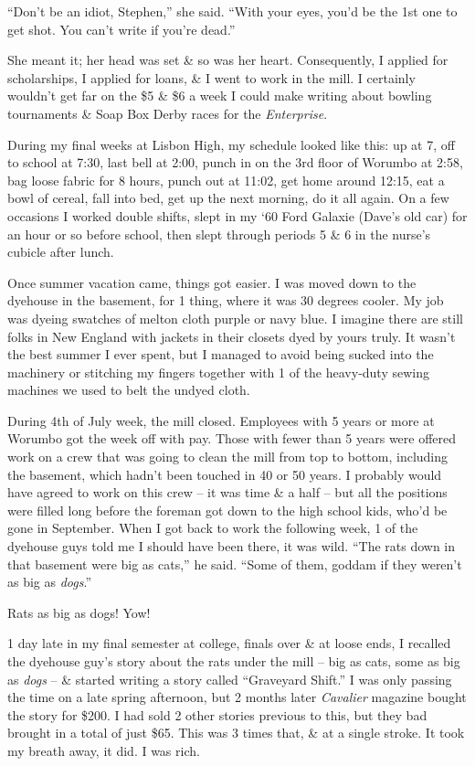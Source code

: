 \documentclass{article}
\numberwithin{equation}{section}
\begin{document}
``Don't be an idiot, Stephen,'' she said. ``With your eyes, you'd be the 1st one to get shot. You can't write if you're dead.''

She meant it; her head was set \& so was her heart. Consequently, I applied for scholarships, I applied for loans, \& I went to work in the mill. I certainly wouldn't get far on the \$5 \& \$6 a week I could make writing about bowling tournaments \& Soap Box Derby races for the \textit{Enterprise}.

During my final weeks at Lisbon High, my schedule looked like this: up at 7, off to school at 7:30, last bell at 2:00, punch in on the 3rd floor of Worumbo at 2:58, bag loose fabric for 8 hours, punch out at 11:02, get home around 12:15, eat a bowl of cereal, fall into bed, get up the next morning, do it all again. On a few occasions I worked double shifts, slept in my `60 Ford Galaxie (Dave's old car) for an hour or so before school, then slept through periods 5 \& 6 in the nurse's cubicle after lunch.

Once summer vacation came, things got easier. I was moved down to the dyehouse in the basement, for 1 thing, where it was 30 degrees cooler. My job was dyeing swatches of melton cloth purple or navy blue. I imagine there are still folks in New England with jackets in their closets dyed by yours truly. It wasn't the best summer I ever spent, but I managed to avoid being sucked into the machinery or stitching my fingers together with 1 of the heavy-duty sewing machines we used to belt the undyed cloth.

During 4th of July week, the mill closed. Employees with 5 years or more at Worumbo got the week off with pay. Those with fewer than 5 years were offered work on a crew that was going to clean the mill from top to bottom, including the basement, which hadn't been touched in 40 or 50 years. I probably would have agreed to work on this crew -- it was time \& a half -- but all the positions were filled long before the foreman got down to the high school kids, who'd be gone in September. When I got back to work the following week, 1 of the dyehouse guys told me I should have been there, it was wild. ``The rats down in that basement were big as cats,'' he said. ``Some of them, goddam if they weren't as big as \textit{dogs}.''

Rats as big as dogs! Yow!

1 day late in my final semester at college, finals over \& at loose ends, I recalled the dyehouse guy's story about the rats under the mill -- big as cats, some as big as \textit{dogs} -- \& started writing a story called ``Graveyard Shift.'' I was only passing the time on a late spring afternoon, but 2 months later \textit{Cavalier} magazine bought the story for \$200. I had sold 2 other stories previous to this, but they bad brought in a total of just \$65. This was 3 times that, \& at a single stroke. It took my breath away, it did. I was rich.
\end{document}
